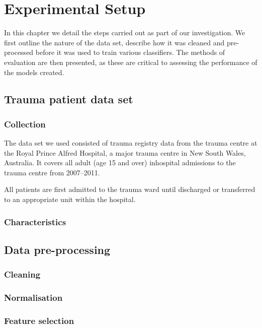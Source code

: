\chapter{Experimental Setup} \label{chap:experiments}

In this chapter we detail the steps carried out as part of our investigation.
We first outline the nature of the data set, describe how it was cleaned and
pre-processed before it was used to train various classifiers. The methods of
evaluation are then presented, as these are critical to assessing the
performance of the models created.

\section{Trauma patient data set}

\subsection{Collection}
The data set we used consisted of trauma registry data from the trauma centre
at the Royal Prince Alfred Hospital, a major trauma centre in New South Wales,
Australia. It covers all adult (age 15 and over) inhospital admissions to the
trauma centre from 2007--2011. 

All patients are first admitted to the trauma ward until discharged
or transferred to an appropriate unit within the hospital. 

\subsection{Characteristics}

\section{Data pre-processing}

\subsection{Cleaning} %

\subsection{Normalisation}

\subsection{Feature selection}

